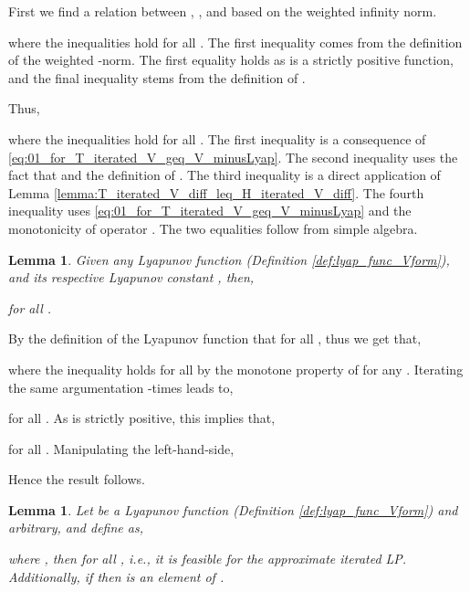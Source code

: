 \documentclass[journal]{IEEEtran}
\newtheorem{lemma}[theorem]{Lemma}
\begin{document}
\vspace{0.2cm}

\begin{IEEEproof}
	First we find a relation between , , and  based on the weighted infinity norm.
	
where the inequalities hold for all . The first inequality comes from the definition of the weighted -norm. The first equality holds as  is a strictly positive function, and the final inequality stems from the definition of .
	
	Thus,
	 
	where the inequalities hold for all . The first inequality is a consequence of \eqref{eq:01_for_T_iterated_V_geq_V_minusLyap}. The second inequality uses the fact that  and the definition of . The third inequality is a direct application of Lemma \ref{lemma:T_iterated_V_diff_leq_H_iterated_V_diff}. The fourth inequality uses \eqref{eq:01_for_T_iterated_V_geq_V_minusLyap} and the monotonicity of operator . The two equalities follow from simple algebra. 
\end{IEEEproof}


\vspace{0.2cm}


\begin{lemma} \label{lemma:lyapunov_function_bound_V_HV}
	Given any Lyapunov function  (Definition \ref{def:lyap_func_Vform}), and its respective Lyapunov constant , then,
	
	for all .
\end{lemma}

\vspace{0.2cm}

\begin{IEEEproof}
By the definition of the Lyapunov function that  for all , thus we get that,
	
	where the inequality holds for all  by the monotone property of  for any . Iterating the same argumentation -times leads to,
	
for all . As  is strictly positive, this implies that,
	
for all . Manipulating the left-hand-side,
	
Hence the result follows.
\end{IEEEproof}


\vspace{0.2cm}


\begin{lemma} \label{lemma:feasible_forIterated_V_by_shifting}
	Let  be a Lyapunov function (Definition \ref{def:lyap_func_Vform}) and  arbitrary, and define  as,
	
	where , then  for all , i.e., it is feasible for the approximate iterated LP. Additionally, if  then  is an element of .
\end{lemma}
\end{document}
